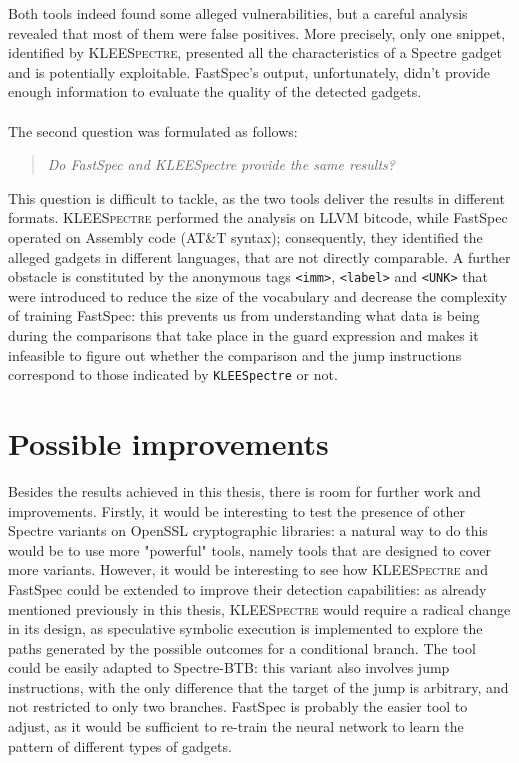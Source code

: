\documentclass[12pt,a4paper]{book}
\theoremstyle{definition}
\begin{document}
	Both tools indeed found some alleged vulnerabilities, but a careful analysis revealed that most of them were false positives. More precisely, only one snippet, identified by \textsc{KLEESpectre}, presented all the characteristics of a Spectre gadget and is potentially exploitable. FastSpec's output, unfortunately, didn't provide enough information to evaluate the quality of the detected gadgets. 
	
	\paragraph{} The second question was formulated as follows:
	\begin{quote}
		\textit{Do FastSpec and KLEESpectre provide the same results?}
	\end{quote}
	This question is difficult to tackle, as the two tools deliver the results in different formats. \textsc{KLEESpectre} performed the analysis on LLVM bitcode, while FastSpec operated on Assembly code (AT\&T syntax); consequently, they identified the alleged gadgets in different languages, that are not directly comparable. A further obstacle is constituted by the anonymous tags \texttt{<imm>}, \texttt{<label>} and \texttt{<UNK>} that were introduced to reduce the size of the vocabulary and decrease the complexity of training FastSpec: this prevents us from understanding what data is being during the comparisons that take place in the guard expression and makes it infeasible to figure out whether the comparison and the jump instructions correspond to those indicated by \texttt{KLEESpectre} or not. 
	
	\section{Possible improvements}
	Besides the results achieved in this thesis, there is room for further work and improvements. Firstly, it would be interesting to test the presence of other Spectre variants on OpenSSL cryptographic libraries: a natural way to do this would be to use more "powerful" tools, namely tools that are designed to cover more variants. However, it would be interesting to see how \textsc{KLEESpectre} and FastSpec could be extended to improve their detection capabilities: as already mentioned previously in this thesis, \textsc{KLEESpectre} would require a radical change in its design, as speculative symbolic execution is implemented to explore the paths generated by the possible outcomes for a conditional branch. The tool could be easily adapted to Spectre-BTB: this variant also involves jump instructions, with the only difference that the target of the jump is arbitrary, and not restricted to only two branches. FastSpec is probably the easier tool to adjust, as it would be sufficient to re-train the neural network to learn the pattern of different types of gadgets.
	
\end{document}
